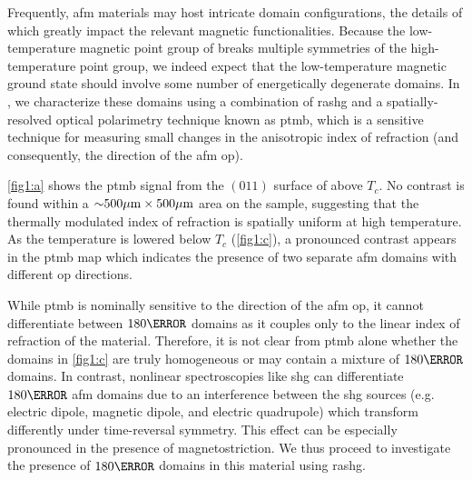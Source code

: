 Frequently, \gls{afm} materials may host intricate domain configurations, the details of which greatly impact the relevant magnetic functionalities\citep{reimers_defect-driven_2022, weber_magnetostrictive_2003}.
Because the low-temperature magnetic point group of \cmb breaks multiple symmetries of the high-temperature point group, we indeed expect that the low-temperature magnetic ground state should involve some number of energetically degenerate domains.
In , we characterize these domains using a combination of \gls{rashg} and a spatially-resolved optical polarimetry technique known as \gls{ptmb}, which is a sensitive technique for measuring small changes in the anisotropic index of refraction (and consequently, the direction of the \gls{afm} \gls{op})\citep{little_three-state_2020, lee_observation_2022}.

\cref{fig1:a} shows the \gls{ptmb} signal from the $(011)$ surface of \cmb above $T_c$.
No contrast is found within a $\apx500\si{\mu m} \times 500\si{\mu m}$ area on the sample, suggesting that the thermally modulated index of refraction is spatially uniform at high temperature.
As the temperature is lowered below $T_c$ (\cref{fig1:c}), a pronounced contrast appears in the \gls{ptmb} map which indicates the presence of two separate \gls{afm} domains with different \gls{op} directions.

While \gls{ptmb} is nominally sensitive to the direction of the \gls{afm} \gls{op}, it cannot differentiate between $180\degree$ domains as it couples only to the linear index of refraction of the material.
Therefore, it is not clear from \gls{ptmb} alone whether the domains in \cref{fig1:c} are truly homogeneous or may contain a mixture of $180\degree$ domains.
In contrast, nonlinear spectroscopies like \gls{shg} can differentiate $180\degree$ \gls{afm} domains due to an interference between the \gls{shg} sources (e.g. electric dipole, magnetic dipole, and electric quadrupole) which transform differently under time-reversal symmetry\citep{fiebig_second-harmonic_2005, fiebig_second_1994, fiebig_second_2001, fiebig_domain_1995}.
This effect can be especially pronounced in the presence of magnetostriction\citep{fiebig_second_2001}.
We thus proceed to investigate the presence of $180\degree$ domains in this material using \gls{rashg}.

